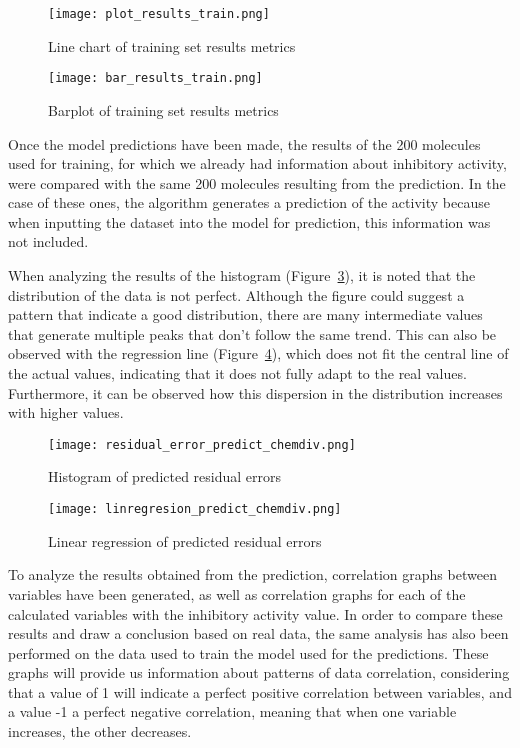\documentclass[final,times,twocolumn,article]{elsarticle}
\begin{document}
 \begin{figure}[ht]
     \centering 
      \texttt{[image: plot\_results\_train.png]}	
      \caption{Line chart of training set results metrics} 
      \label{Figure3}
  \end{figure}
 
  \begin{figure}[ht]
     \centering 
      \texttt{[image: bar\_results\_train.png]}	
      \caption{Barplot of training set results metrics} 
      \label{Figure4}
  \end{figure}

Once the model predictions have been made, the results of the 200 molecules used for training, for which we already had information about inhibitory activity, were compared with the same 200 molecules resulting from the prediction. In the case of these ones, the algorithm generates a prediction of the activity because when inputting the dataset into the model for prediction, this information was not included. 

When analyzing the results of the histogram (Figure~\ref{Figure5}), it is noted that the distribution of the data is not perfect. Although the figure could suggest a pattern that indicate a good distribution, there are many intermediate values that generate multiple peaks that don't follow the same trend. This can also be observed with the regression line (Figure~\ref{Figure6}), which does not fit the central line of the actual values, indicating that it does not fully adapt to the real values. Furthermore, it can be observed how this dispersion in the distribution increases with higher values. 

\begin{figure}[ht]
    \centering 
     \texttt{[image: residual\_error\_predict\_chemdiv.png]}	
     \caption{Histogram of predicted residual errors} 
     \label{Figure5}
 \end{figure}

 \begin{figure}[ht]
    \centering 
     \texttt{[image: linregresion\_predict\_chemdiv.png]}	
     \caption{Linear regression of predicted residual errors} 
     \label{Figure6}
 \end{figure}

 To analyze the results obtained from the prediction, correlation graphs between variables have been generated, as well as correlation graphs for each of the calculated variables with the inhibitory activity value. In order to compare these results and draw a conclusion based on real data, the same analysis has also been performed on the data used to train the model used for the predictions. These graphs will provide us information about patterns of data correlation, considering that a value of 1 will indicate a perfect positive correlation between variables, and a value -1 a perfect negative correlation, meaning that when one variable increases, the other decreases. 
\end{document}

